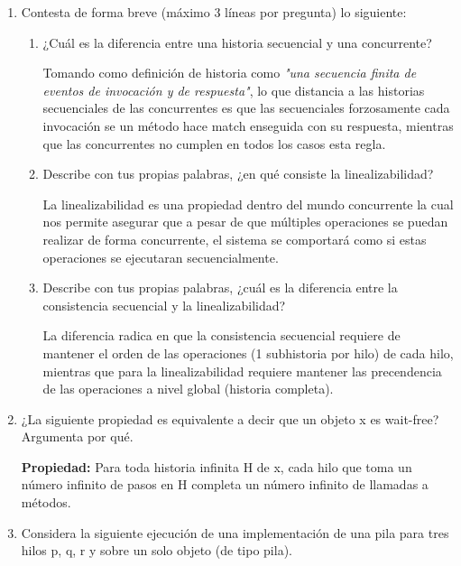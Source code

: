 \begin{enumerate}
    \item Contesta de forma breve (máximo 3 líneas por pregunta) lo siguiente:

    \begin{enumerate}
        \item ¿Cuál es la diferencia entre una historia secuencial y una concurrente?

        Tomando como definición de historia como \textit{"una secuencia finita de eventos de invocación y de respuesta"}, lo que distancia a las historias secuenciales de las concurrentes es que las secuenciales forzosamente cada invocación se un método hace match enseguida con su respuesta, mientras que las concurrentes no cumplen en todos los casos esta regla. 
        
        \item Describe con tus propias palabras, ¿en qué consiste la linealizabilidad?

        La linealizabilidad es una propiedad dentro del mundo concurrente la cual nos permite asegurar que a pesar de que múltiples operaciones se puedan realizar de forma concurrente, el sistema se comportará como si estas operaciones se ejecutaran secuencialmente. 
        
        \item Describe con tus propias palabras, ¿cuál es la diferencia entre la consistencia secuencial y la linealizabilidad?

        La diferencia radica en que la consistencia secuencial requiere de mantener el orden de las operaciones (1 subhistoria por hilo) de cada hilo, mientras que para la linealizabilidad requiere mantener las precendencia de las operaciones a nivel global (historia completa).

        \hfill
    \end{enumerate}

    \item ¿La siguiente propiedad es equivalente a decir que un objeto x es wait-free?
    Argumenta por qué.
    
    \textbf{Propiedad:} Para toda historia infinita H de x, cada hilo que toma un número infinito de pasos en H completa un número infinito de llamadas a métodos. 

    \item Considera la siguiente ejecución de una implementación de una pila para tres hilos p, q, r y sobre un solo objeto (de tipo pila).
    

\end{enumerate}
